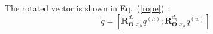 
The rotated vector is shown in Eq.~(\ref{rope}) :
\begin{equation}
\label{rope}
    \widetilde{q} =\left[ \boldsymbol{R}_{\boldsymbol{\Theta},x_h}^{d_h}  {q^{(h)}};\boldsymbol{R}_{\boldsymbol{\Theta},x_h}^{d_h}{q^{(w)}}\right]
\end{equation}
